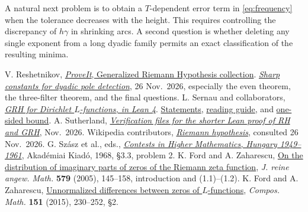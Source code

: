 \documentclass[11pt,letterpaper]{article}
\newcommand{\art}[2]{\href{#1}{#2}}
\newcommand{\head}[1]{\par\medskip{\large\bfseries\color{ink}#1}\par\smallskip}
\begin{document}
\head{Further research}
A natural next problem is to obtain a \(T\)-dependent error term in
\eqref{eq:frequency} when the tolerance decreases with the height. This
requires controlling the discrepancy of \(h\gamma\) in shrinking arcs.
A second question is whether deleting any single exponent from a long
dyadic family permits an exact classification of the resulting minima.

{\small
\begin{thebibliography}{9}\setlength{\itemsep}{1pt}
 V. Reshetnikov, \art{https://github.com/VladimirReshetnikov/ProveIt/tree/b9a7c196e4aed3d93d4f222efef677a50efe912b/Analysis/GeneralizedRiemannHypothesis}{\emph{ProveIt}, Generalized Riemann Hypothesis collection}.
\art{https://github.com/VladimirReshetnikov/ProveIt/blob/b9a7c196e4aed3d93d4f222efef677a50efe912b/Analysis/GeneralizedRiemannHypothesis/docs/incoming/dyadic_pole_detection_2026-11-26.zip}{\emph{Sharp constants for dyadic pole detection}}, 26 Nov.\ 2026, especially the even theorem, the three-filter theorem, and the final questions.
 L. Sernau and collaborators, \art{https://github.com/lsernau/grh-lean/tree/72fead102f663d5c7a407964a13dc0cf9d977207}{\emph{GRH for Dirichlet \(L\)-functions, in Lean 4}}.
\art{https://github.com/lsernau/grh-lean/blob/72fead102f663d5c7a407964a13dc0cf9d977207/grh/src/Statements.lean}{Statements},
\art{https://github.com/lsernau/grh-lean/blob/72fead102f663d5c7a407964a13dc0cf9d977207/grh/GUIDE.md}{reading guide}, and
\art{https://github.com/lsernau/grh-lean/blob/72fead102f663d5c7a407964a13dc0cf9d977207/grh/src/New/Reduction/OneSidedBound.lean}{one-sided bound}.
 A. Sutherland, \art{https://math.mit.edu/~drew/shortgrh/}{\emph{Verification files for the shorter Lean proof of RH and GRH}}, Nov.\ 2026.
 Wikipedia contributors, \art{https://en.wikipedia.org/wiki/Riemann_hypothesis}{\emph{Riemann hypothesis}}, consulted 26 Nov.\ 2026.
 G. Sz\'asz et al., eds., \art{https://real-eod.mtak.hu/14558/1/AkademiaiKiado_007070.pdf}{\emph{Contests in Higher Mathematics, Hungary 1949--1961}}, Akad\'emiai Kiad\'o, 1968, \S3.3, problem 2.
 K. Ford and A. Zaharescu, \art{https://arxiv.org/abs/math/0405459}{On the distribution of imaginary parts of zeros of the Riemann zeta function}, \emph{J. reine angew. Math.} \textbf{579} (2005), 145--158, introduction and (1.1)--(1.2).
 K. Ford and A. Zaharescu, \art{https://doi.org/10.1112/S0010437X14007659}{Unnormalized differences between zeros of \(L\)-functions}, \emph{Compos. Math.} \textbf{151} (2015), 230--252, \S2.
\end{thebibliography}}
\end{document}
